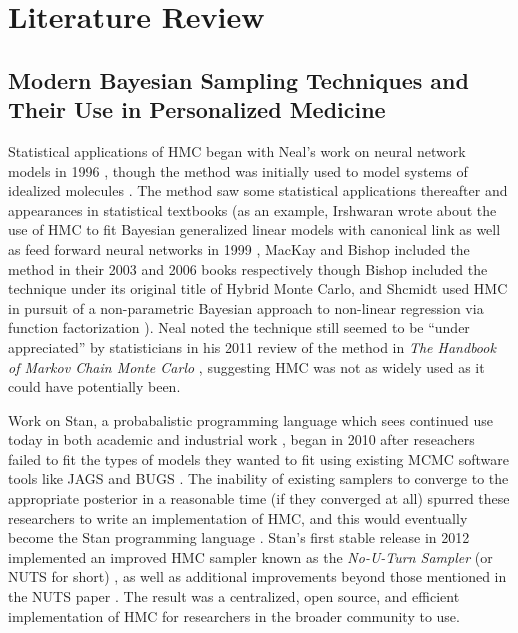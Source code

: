 \chapter{Literature Review}

\section{Modern Bayesian Sampling Techniques and Their Use in Personalized Medicine}

Statistical applications of HMC began with Neal's work on neural network models in 1996 \cite{Neal1996-vn, brooks2011handbook}, though the method was initially used to model systems of idealized molecules \cite{duane1987hybrid}. The method saw some statistical applications thereafter and appearances in statistical textbooks (as an example, Irshwaran wrote about the use of HMC to fit Bayesian generalized linear models with canonical link as well as feed forward neural networks in 1999 \cite{ishwaran1999applications}, MacKay \cite[Chapter~30]{mackay2003information} and Bishop \cite[Chapter~11]{Bishop2006pattern} included the method in their 2003 and 2006 books respectively though Bishop included the technique under its original title of Hybrid Monte Carlo, and Shcmidt used HMC in pursuit of a non-parametric Bayesian approach to non-linear regression via function factorization \cite{schmidt2009function}). Neal noted the technique still seemed to be ``under appreciated'' by statisticians in his 2011 review of the method in \textit{The Handbook of Markov Chain Monte Carlo} \cite[Chapter~5]{brooks2011handbook}, suggesting HMC was not as widely used as it could have potentially been.

Work on Stan, a probabalistic programming language which sees continued use today in both academic and industrial work \needscite, began in 2010 \cite{stan2012} after reseachers failed to fit the types of models they wanted to fit using existing MCMC software tools like JAGS \cite{plummer2003jags} and BUGS \cite{lunn2000winbugs}.  The inability of existing samplers to converge to the appropriate posterior in a reasonable time (if they converged at all) spurred these researchers to write an implementation of HMC, and this would eventually become the Stan programming language \cite{stan2012}.  Stan's first stable release in 2012 \cite{stan2012} implemented an improved HMC sampler known as the \textit{No-U-Turn Sampler} (or NUTS for short) \cite{stan2012, hoffman2014no}, as well as additional improvements beyond those mentioned in the NUTS paper \cite{stan2012}.  The result was a centralized, open source, and efficient implementation of HMC for researchers in the broader community to use.

